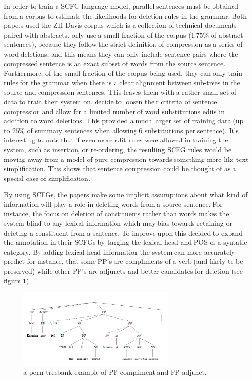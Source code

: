 {In order to train a SCFG language model, parallel sentences must be obtained from a corpus to estimate the likelihoods for deletion rules in the grammar.  Both papers used the Ziff-Davis corpus which is a collection of technical documents paired with abstracts. \citet{knight2000statistics} only use a small fraction of the corpus ($1.75 \%$ of abstract sentences), because they follow the strict definition of compression as a series of word deletions, and this means they can only include sentence pairs where the compressed sentence is an exact subset of words from the source sentence.  Furthermore, of the small fraction of the corpus being used, they can only train rules for the grammar when there is a clear alignment between sub-trees in the source and compression sentences.  This leaves them with a rather small set of data to train their system on.  \citet{galley2007lexicalized} decide to loosen their criteria of sentence compression and allow for a limited number of word substitutions edits in addition to word deletions.  This provided a much larger set of training data (up to $25 \%$ of summary sentences when allowing 6 substitutions per sentence).   It's interesting to note that if even more edit rules were allowed in training the system, such as insertion, or re-ordering, the resulting SCFG rules would be moving away from a model of pure compression towards something more like text simplification.  This shows that sentence compression could be thought of as a special case of simplification.}


{By using SCFGs, the papers make some implicit assumptions about what kind of information will play a role in deleting words from a source sentence.  For instance, the focus on deletion of constituents rather than words makes the system blind to any lexical information which may bias towards retaining or deleting a constituent from a sentence. To improve upon this \citet{galley2007lexicalized} decided to expand the annotation in their SCFGs by tagging the lexical head and POS of a syntatic category.  By adding lexical head information the system can more accurately predict for instance, that some PP's are compliments of a verb (and likely to be preserved) while other PP's are adjuncts and better candidates for deletion (see figure \ref{fig:tree}).}

\begin{figure}[H]
\centering
\includegraphics[width=0.7\textwidth]{tree1.png}
\caption{a penn treebank example of PP compliment and PP adjunct.}
\label{fig:tree}
\end{figure}

